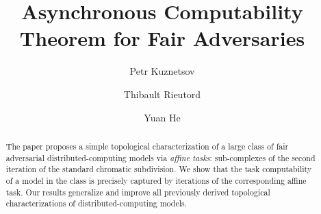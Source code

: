 \documentclass[a4paper]{article}
\begin{document}
\title{Asynchronous Computability Theorem for Fair Adversaries}

\author[1]{Petr Kuznetsov}
\author[1]{Thibault Rieutord}
\author[3]{Yuan He}






\date{}
\maketitle
\begin{abstract}
The paper proposes a simple topological characterization of
a large class of fair  adversarial distributed-computing models via  
\emph{affine tasks}: sub-complexes of the second
iteration of the standard chromatic subdivision.
We show that the task computability of a model in the class is precisely captured by
iterations of the corresponding affine task. 
%
Our results generalize and improve all previously derived
topological characterizations of distributed-computing models. 
%
%
\end{abstract}
\end{document}
